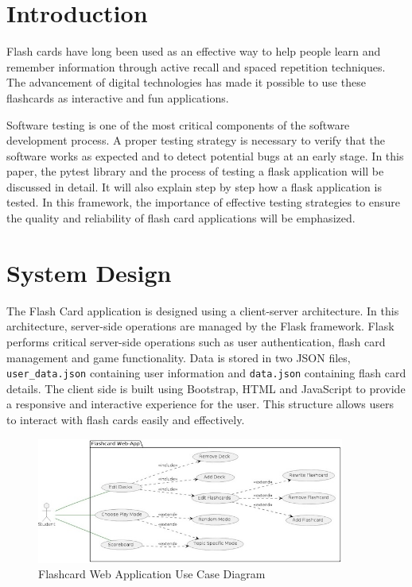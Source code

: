 
\newpage

\section{Introduction}

Flash cards have long been used as an effective way to help people learn and remember information through active recall and spaced repetition techniques. The advancement of digital technologies has made it possible to use these flashcards as interactive and fun applications.

Software testing is one of the most critical components of the software development process. A proper testing strategy is necessary to verify that the software works as expected and to detect potential bugs at an early stage. In this paper, the pytest library and the process of testing a flask application will be discussed in detail. It will also explain step by step how a flask application is tested. In this framework, the importance of effective testing strategies to ensure the quality and reliability of flash card applications will be emphasized.

\section{System Design}
The Flash Card application is designed using a client-server architecture. In this architecture, server-side operations are managed by the Flask framework. Flask performs critical server-side operations such as user authentication, flash card management and game functionality. Data is stored in two JSON files, \texttt{user\_data.json} containing user information and \texttt{data.json} containing flash card details. The client side is built using Bootstrap, HTML and JavaScript to provide a responsive and interactive experience for the user. This structure allows users to interact with flash cards easily and effectively.

            \begin{figure}[H]
                \centering
                \includegraphics[width=0.9\textwidth]{UCD.jpeg}
                \caption{Flashcard Web Application Use Case Diagram}
                \label{fig:FlashcardWebApplicationUseCaseDiagram}
            \end{figure}\newpage


